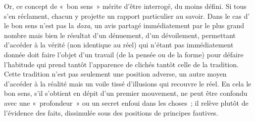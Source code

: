 Or, ce concept de «~bon sens~» mérite d'être interrogé, du moins défini. Si tous s'en réclament, chacun y projette un rapport particulier au savoir. Dans le cas d'\robbe{} le bon sens n'est pas la \textit{doxa}, un avis partagé immédiatement par le plus grand nombre mais bien le résultat d'un dénuement, d'un dévoilement, permettant d'accéder à la vérité (non identique au réel) qui n'étant pas immédiatement donnée doit faire l'objet d'un travail (de la pensée ou de la forme) pour défaire l'habitude qui prend tantôt l'apparence de clichés tantôt celle de la tradition. Cette tradition n'est pas seulement une position adverse, un autre moyen d'accéder à la réalité mais un voile tissé d'illusions qui recouvre le réel. En cela le bon sens, s'il s'obtient en dépit d'un premier mouvement, ne peut être confondu avec une «~profondeur~» ou un secret enfoui dans les choses~; il relève plutôt de l'évidence des faits, dissimulée sous des positions de principes fautives. 

